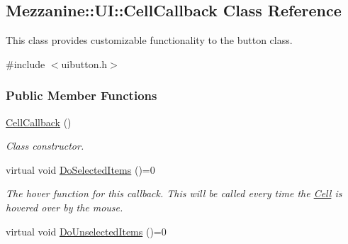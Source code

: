 \hypertarget{classMezzanine_1_1UI_1_1CellCallback}{
\subsection{Mezzanine::UI::CellCallback Class Reference}
\label{classMezzanine_1_1UI_1_1CellCallback}
}


This class provides customizable functionality to the button class.  




{\ttfamily \#include $<$uibutton.h$>$}

\subsubsection*{Public Member Functions}
\begin{DoxyCompactItemize}
\item 
\hypertarget{classMezzanine_1_1UI_1_1CellCallback_a56298f6efbe3124083d8202f9f9dfcdd}{
\hyperlink{classMezzanine_1_1UI_1_1CellCallback_a56298f6efbe3124083d8202f9f9dfcdd}{CellCallback} ()}
\label{classMezzanine_1_1UI_1_1CellCallback_a56298f6efbe3124083d8202f9f9dfcdd}

\begin{DoxyCompactList}\small\item\em Class constructor. \item\end{DoxyCompactList}\item 
\hypertarget{classMezzanine_1_1UI_1_1CellCallback_a0f05612d39cfc3161b16c9f30264b893}{
virtual void \hyperlink{classMezzanine_1_1UI_1_1CellCallback_a0f05612d39cfc3161b16c9f30264b893}{DoSelectedItems} ()=0}
\label{classMezzanine_1_1UI_1_1CellCallback_a0f05612d39cfc3161b16c9f30264b893}

\begin{DoxyCompactList}\small\item\em The hover function for this callback. This will be called every time the \hyperlink{classMezzanine_1_1UI_1_1Cell}{Cell} is hovered over by the mouse. \item\end{DoxyCompactList}\item 
\hypertarget{classMezzanine_1_1UI_1_1CellCallback_a9b34ee48e222767e8a06c8c8e131628c}{
virtual void \hyperlink{classMezzanine_1_1UI_1_1CellCallback_a9b34ee48e222767e8a06c8c8e131628c}{DoUnselectedItems} ()=0}
\label{classMezzanine_1_1UI_1_1CellCallback_a9b34ee48e222767e8a06c8c8e131628c}


\end{DoxyCompactItemize}
